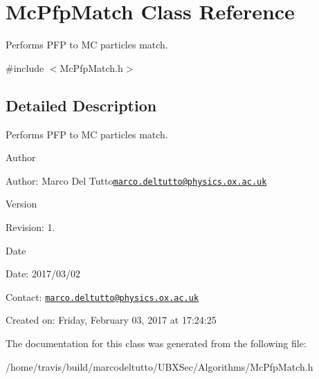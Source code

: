 \hypertarget{classMcPfpMatch}{\section{Mc\-Pfp\-Match Class Reference}
\label{classMcPfpMatch}
}


Performs P\-F\-P to M\-C particles match.  




{\ttfamily \#include $<$Mc\-Pfp\-Match.\-h$>$}



\subsection{Detailed Description}
Performs P\-F\-P to M\-C particles match. 

\begin{DoxyAuthor}{Author}

\end{DoxyAuthor}
\begin{DoxyParagraph}{Author\-:}
Marco Del Tutto\href{mailto:marco.deltutto@physics.ox.ac.uk}{\tt marco.\-deltutto@physics.\-ox.\-ac.\-uk} 
\end{DoxyParagraph}


\begin{DoxyVersion}{Version}

\end{DoxyVersion}
\begin{DoxyParagraph}{Revision\-:}
1. 
\end{DoxyParagraph}


\begin{DoxyDate}{Date}

\end{DoxyDate}
\begin{DoxyParagraph}{Date\-:}
2017/03/02 
\end{DoxyParagraph}


Contact\-: \href{mailto:marco.deltutto@physics.ox.ac.uk}{\tt marco.\-deltutto@physics.\-ox.\-ac.\-uk}

Created on\-: Friday, February 03, 2017 at 17\-:24\-:25 

The documentation for this class was generated from the following file\-:\begin{DoxyCompactItemize}
\item 
/home/travis/build/marcodeltutto/\-U\-B\-X\-Sec/\-Algorithms/Mc\-Pfp\-Match.\-h\end{DoxyCompactItemize}
